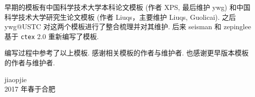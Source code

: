 \begin{acknowledgements}

早期的模板有中国科学技术大学本科论文模板 (作者 XPS, 最后维护 ywg)
和中国科学技术大学研究生论文模板 (作者 Liuqs，主要维护 Liuqs, Guolicai).
之后 ywg@USTC 对这两个模板进行了整合梳理并对其维护.
后来 seisman 和 zepinglee 基于 \verb|ctex| 2.0 重新编写了模板.

编写过程中参考了以上模板.
感谢相关模板的作者与维护者. 也感谢更早版本模板的作者与维护者.

\begin{flushright}
jiaopjie\\
2017 年春于合肥
\end{flushright}

\end{acknowledgements}
